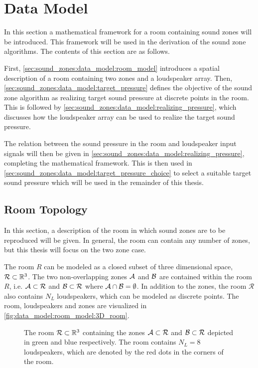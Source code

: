 \section{Data Model}
\label{sec:sound_zones:data_model}
In this section a mathematical framework for a room containing sound zones will be introduced.
This framework will be used in the derivation of the sound zone algorithms.
The contents of this section are as follows.

First, \autoref{sec:sound_zones:data_model:room_model} introduces a spatial description of a room containing two zones and a loudspeaker array.
Then, \autoref{sec:sound_zones:data_model:target_pressure} defines the objective of the sound zone algorithm as realizing target sound pressure at discrete points in the room.
This is followed by \autoref{sec:sound_zones:data_model:realizing_pressure}, which discusses how the loudspeaker array can be used to realize the target sound pressure.

The relation between the sound pressure in the room and loudspeaker input signals will then be given in \autoref{sec:sound_zones:data_model:realizing_pressure}, completing the mathematical framework.
This is then used in \autoref{sec:sound_zones:data_model:target_pressure_choice} to select a suitable target sound pressure which will be used in the remainder of this thesis.

\subsection{Room Topology}
\label{sec:sound_zones:data_model:room_model}
In this section, a description of the room in which sound zones are to be reproduced will be given.
In general, the room can contain any number of zones, but this thesis will focus on the two zone case. 


The room $R$ can be modeled as a closed subset of three dimensional space, $\mathcal{R} \subset \mathbb{R}^{3}$.
The two non-overlapping zones $\mathcal{A}$ and $\mathcal{B}$ are contained within the room $R$, 
i.e. $\mathcal{A} \subset \mathcal{R}$ and $\mathcal{B} \subset \mathcal{R}$ where $\mathcal{A} \cap \mathcal{B} = \emptyset$.
In addition to the zones, the room $\mathcal{R}$ also contains $N_L$ loudspeakers, which can be modeled as discrete points.
The room, loudspeakers and zones are visualized in \autoref{fig:data_model:room_model:3D_room}.

\begin{figure}
    \centering
    
    \caption{The room $\mathcal{R}\subset \mathbb{R}^{3}$ containing the zones $\mathcal{A}\subset\mathcal{R}$ 
    and $\mathcal{B}\subset\mathcal{R}$ depicted in green and blue respectively. 
    The room contains $N_L = 8$ loudspeakers, which are denoted by the red dots in the corners of the room.}
    \label{fig:data_model:room_model:3D_room}
\end{figure}

